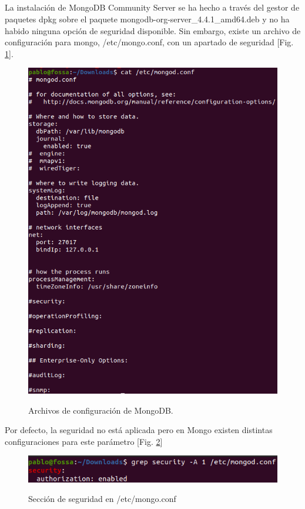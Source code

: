 \documentclass[10pt,a4paper]{article}
\begin{document}
\subsection{}
La instalación de MongoDB Community Server se ha hecho a través del gestor de paquetes dpkg sobre el paquete mongodb-org-server\_4.4.1\_amd64.deb y no ha habido ninguna opción de seguridad disponible. Sin embargo, existe un archivo de configuración para mongo, /etc/mongo.conf, con un apartado de seguridad [Fig. \ref{fig:mongoconf}]. 
\begin{figure}[h!]
  \centering
  \includegraphics[scale=0.4]{mongoconf.png}\\
  \caption{Archivos de configuración de MongoDB.}
  \label{fig:mongoconf}
\end{figure}

\pagebreak

Por defecto, la seguridad no está aplicada pero en Mongo existen distintas configuraciones para este parámetro [Fig. \ref{fig:mongo_sec}]
\begin{figure}[h!]
  \centering
  \includegraphics[scale=0.4]{mongosec.png}\\
  \caption{Sección de seguridad en /etc/mongo.conf}
  \label{fig:mongo_sec}
\end{figure}
\end{document}

